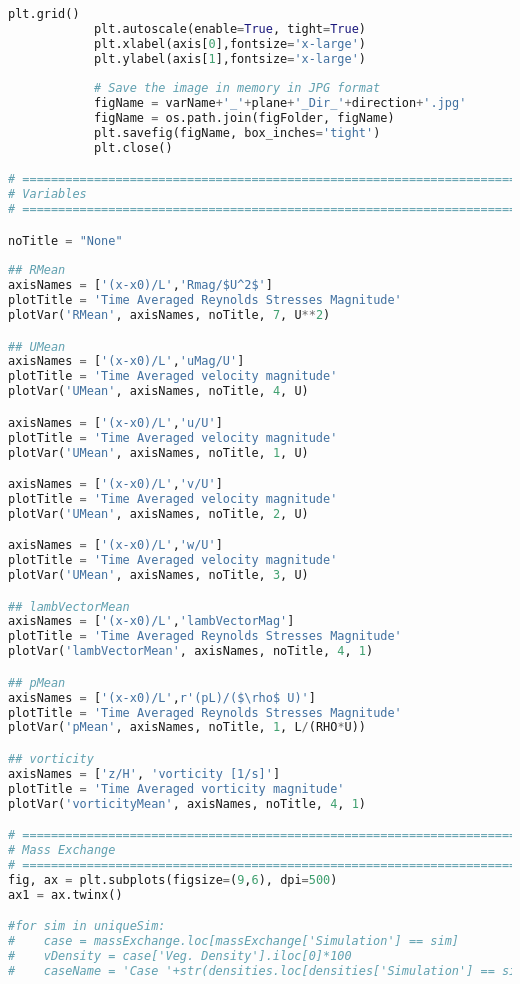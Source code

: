 \begin{lstlisting}[language=python]
            plt.grid()
            plt.autoscale(enable=True, tight=True)
            plt.xlabel(axis[0],fontsize='x-large')
            plt.ylabel(axis[1],fontsize='x-large')
            
            # Save the image in memory in JPG format
            figName = varName+'_'+plane+'_Dir_'+direction+'.jpg'
            figName = os.path.join(figFolder, figName)
            plt.savefig(figName, box_inches='tight')
            plt.close()

# =============================================================================
# Variables
# =============================================================================

noTitle = "None"
            
## RMean
axisNames = ['(x-x0)/L','Rmag/$U^2$']
plotTitle = 'Time Averaged Reynolds Stresses Magnitude'
plotVar('RMean', axisNames, noTitle, 7, U**2)

## UMean
axisNames = ['(x-x0)/L','uMag/U']
plotTitle = 'Time Averaged velocity magnitude'
plotVar('UMean', axisNames, noTitle, 4, U)

axisNames = ['(x-x0)/L','u/U']
plotTitle = 'Time Averaged velocity magnitude'
plotVar('UMean', axisNames, noTitle, 1, U)

axisNames = ['(x-x0)/L','v/U']
plotTitle = 'Time Averaged velocity magnitude'
plotVar('UMean', axisNames, noTitle, 2, U)

axisNames = ['(x-x0)/L','w/U']
plotTitle = 'Time Averaged velocity magnitude'
plotVar('UMean', axisNames, noTitle, 3, U)

## lambVectorMean
axisNames = ['(x-x0)/L','lambVectorMag']
plotTitle = 'Time Averaged Reynolds Stresses Magnitude'
plotVar('lambVectorMean', axisNames, noTitle, 4, 1)

## pMean
axisNames = ['(x-x0)/L',r'(pL)/($\rho$ U)']
plotTitle = 'Time Averaged Reynolds Stresses Magnitude'
plotVar('pMean', axisNames, noTitle, 1, L/(RHO*U))

## vorticity
axisNames = ['z/H', 'vorticity [1/s]']
plotTitle = 'Time Averaged vorticity magnitude'
plotVar('vorticityMean', axisNames, noTitle, 4, 1)

# =============================================================================
# Mass Exchange
# =============================================================================
fig, ax = plt.subplots(figsize=(9,6), dpi=500)
ax1 = ax.twinx()

#for sim in uniqueSim:
#    case = massExchange.loc[massExchange['Simulation'] == sim]
#    vDensity = case['Veg. Density'].iloc[0]*100
#    caseName = 'Case '+str(densities.loc[densities['Simulation'] == sim].index[0])
    

\end{lstlisting}
